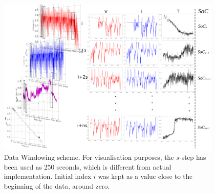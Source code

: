 \begin{landscape}
    \begin{figure}[ht]
        \centering
        \includegraphics[width=0.9\linewidth]{II_Body/images/Windowing3D-3.jpg}
        \caption{Data Windowing scheme. For visualisation purposes, the $s$-step has been used as 250 seconds, which is different from actual implementation. Initial index $i$ was kept as a value close to the beginning of the data, around zero.}
        \label{fig:Windowing}
    \end{figure}
\end{landscape}
%
%
